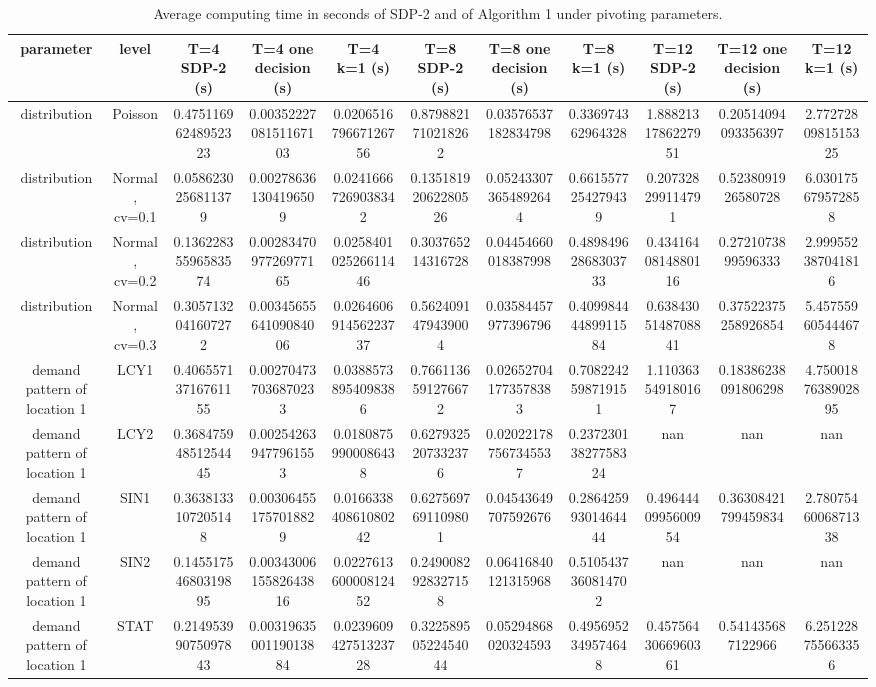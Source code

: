 \begin{table}[H]
\centering
\caption{Average computing time in seconds of SDP-2 and of Algorithm 1 under pivoting parameters.}
\label{tab:test2_Q2_pivot}
\begin{tabular}{ccccccccccc}
\toprule
parameter & level & T=4 SDP-2 (s) & T=4 one decision (s) & T=4 k=1 (s) & T=8 SDP-2 (s) & T=8 one decision (s) & T=8 k=1 (s) & T=12 SDP-2 (s) & T=12 one decision (s) & T=12 k=1 (s) \\
\midrule
distribution & Poisson & 0.47511696248952323 & 0.0035222708151167103 & 0.020651679667126756 & 0.8798821710218262 & 0.03576537182834798 & 0.336974362964328 & 1.8882131786227951 & 0.20514094093356397 & 2.7727280981515325 \\
distribution & Normal, cv=0.1 & 0.0586230256811379 & 0.002786361304196509 & 0.02416667269038342 & 0.13518192062280526 & 0.052433073654892644 & 0.6615577254279439 & 0.207328299114791 & 0.5238091926580728 & 6.030175679572858 \\
distribution & Normal, cv=0.2 & 0.13622835596583574 & 0.0028347097726977165 & 0.025840102526611446 & 0.303765214316728 & 0.04454660018387998 & 0.48984962868303733 & 0.4341640814880116 & 0.2721073899596333 & 2.999552387041816 \\
distribution & Normal, cv=0.3 & 0.3057132041607272 & 0.0034565564109084006 & 0.026460691456223737 & 0.5624091479439004 & 0.03584457977396796 & 0.40998444489911584 & 0.6384305148708841 & 0.37522375258926854 & 5.457559605444678 \\
demand pattern of location 1 & LCY1 & 0.40655713716761155 & 0.002704737036870233 & 0.03885738954098386 & 0.7661136591276672 & 0.026527041773578383 & 0.7082242598719151 & 1.110363549180167 & 0.18386238091806298 & 4.7500187638902895 \\
demand pattern of location 1 & LCY2 & 0.36847594851254445 & 0.002542639477961553 & 0.01808759900086438 & 0.6279325207332376 & 0.020221787567345537 & 0.23723013827758324 & nan & nan & nan \\
demand pattern of location 1 & SIN1 & 0.3638133107205148 & 0.003064551757018829 & 0.016633840861080242 & 0.6275697691109801 & 0.04543649707592676 & 0.28642599301464444 & 0.4964440995600954 & 0.36308421799459834 & 2.7807546006871338 \\
demand pattern of location 1 & SIN2 & 0.14551754680319895 & 0.0034300615582643816 & 0.022761360000812452 & 0.2490082928327158 & 0.06416840121315968 & 0.5105437360814702 & nan & nan & nan \\
demand pattern of location 1 & STAT & 0.21495399075097843 & 0.0031963500119013884 & 0.023960942751323728 & 0.32258950522454044 & 0.05294868020324593 & 0.4956952349574648 & 0.4575643066960361 & 0.541435687122966 & 6.251228755663356 \\

\end{tabular}
\end{table}
